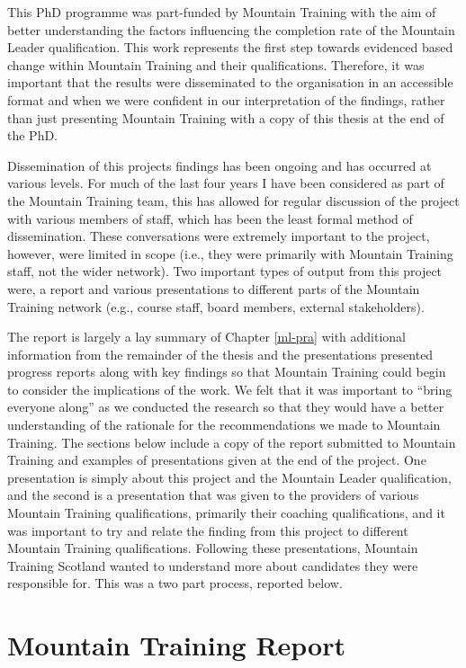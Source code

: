 \documentclass[
  12pt,
  a4paper,
]{book}
\begin{document}
This PhD programme was part-funded by Mountain Training with the aim of better understanding the factors influencing the completion rate of the Mountain Leader qualification. This work represents the first step towards evidenced based change within Mountain Training and their qualifications. Therefore, it was important that the results were disseminated to the organisation in an accessible format and when we were confident in our interpretation of the findings, rather than just presenting Mountain Training with a copy of this thesis at the end of the PhD.

Dissemination of this projects findings has been ongoing and has occurred at various levels. For much of the last four years I have been considered as part of the Mountain Training team, this has allowed for regular discussion of the project with various members of staff, which has been the least formal method of dissemination. These conversations were extremely important to the project, however, were limited in scope (i.e., they were primarily with Mountain Training staff, not the wider network). Two important types of output from this project were, a report and various presentations to different parts of the Mountain Training network (e.g., course staff, board members, external stakeholders).

The report is largely a lay summary of Chapter \ref{ml-pra} with additional information from the remainder of the thesis and the presentations presented progress reports along with key findings so that Mountain Training could begin to consider the implications of the work. We felt that it was important to ``bring everyone along'' as we conducted the research so that they would have a better understanding of the rationale for the recommendations we made to Mountain Training. The sections below include a copy of the report submitted to Mountain Training and examples of presentations given at the end of the project. One presentation is simply about this project and the Mountain Leader qualification, and the second is a presentation that was given to the providers of various Mountain Training qualifications, primarily their coaching qualifications, and it was important to try and relate the finding from this project to different Mountain Training qualifications. Following these presentations, Mountain Training Scotland wanted to understand more about candidates they were responsible for. This was a two part process, reported below.

\hypertarget{impact-report}{%
\section{Mountain Training Report}\label{impact-report}}
\end{document}
